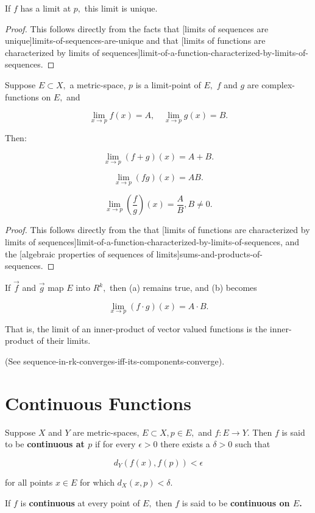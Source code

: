 \documentclass{article}
\begin{document}
\begin{corollary}\label{limit-of-a-function-at-a-point-is-unique-if-it-exists}
If $f$ has a \@{limit} at $p,$ this \@{limit} is unique.
\end{corollary}

\begin{proof}
This follows directly from the facts that \@[limits of sequences are unique]{limits-of-sequences-are-unique} and that \@[limits of functions are characterized by limits of sequences]{limit-of-a-function-characterized-by-limits-of-sequences}.
\end{proof}

\begin{theorem}
Suppose $E \subset X,$ a \@{metric-space}, $p$ is a \@{limit-point} of $E,$ $f$ and $g$ are \@{complex-functions} on $E,$ and

\[ \lim_{x \to p} f(x) = A, \quad \lim_{x \to p} g(x) = B. \]

Then:

\[ \lim_{x \to p} (f + g)(x) = A + B. \]

\[ \lim_{x \to p} (fg)(x) = AB. \]

\[ \lim_{x \to p} (\frac{f}{g})(x) = \frac{A}{B}, B \neq 0. \]
\end{theorem}

\begin{proof}
This follows directly from the that \@[limits of functions are characterized by limits of sequences]{limit-of-a-function-characterized-by-limits-of-sequences}, and the \@[algebraic properties of sequences of limits]{sums-and-products-of-sequences}.
\end{proof}

\begin{remark}
If $\vec{f}$ and $\vec{g}$ map $E$ into $R^k,$ then (a) remains true, and (b) becomes

\[ \lim_{x \to p} (f \cdot g)(x) = A \cdot B. \]

That is, the \@{limit} of an \@{inner-product} of vector valued functions is the \@{inner-product} of their \@{limits}.

(See \@{sequence-in-rk-converges-iff-its-components-converge}).
\end{remark}

\section{Continuous Functions}

\begin{definition}[Continuous]
Suppose $X$ and $Y$ are \@{metric-spaces}, $E \subset X, p \in E,$ and $f : E \to Y.$ Then $f$ is said to be \textbf{continuous at $p$} if for every $\epsilon > 0$ there exists a $\delta > 0$ such that

\[ d_Y(f(x), f(p)) < \epsilon \]

for all points $x \in E$ for which $d_X(x, p) < \delta.$

If $f$ is \textbf{continuous} at every \@{point} of $E,$ then $f$ is said to be \textbf{continuous on $E$.}
\end{definition}
\end{document}
